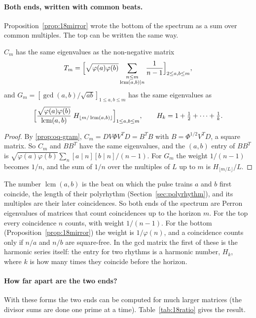 \paragraph{Both ends, written with common beats.} Proposition~\ref{prop:18mirror} wrote the bottom of the
spectrum as a sum over common multiples. The top can be written the same way.

\begin{proposition}\label{prop:18harmonic}
$C_m$ has the same eigenvalues as the non-negative matrix
\[
  T_m=\Bigl[\sqrt{\varphi(a)\varphi(b)}\sum_{\substack{n\le m\\ \operatorname{lcm}(a,b)\mid n}}\frac{1}{n-1}\Bigr]_{2\le a,b\le m},
\]
and $G_m=[\gcd(a,b)/\sqrt{ab}]_{1\le a,b\le m}$ has the same eigenvalues as
\[
  \Bigl[\frac{\sqrt{\varphi(a)\varphi(b)}}{\operatorname{lcm}(a,b)}\;H_{\lfloor m/\operatorname{lcm}(a,b)\rfloor}\Bigr]_{1\le a,b\le m},
  \qquad H_k=1+\tfrac12+\cdots+\tfrac1k .
\]
\end{proposition}

\begin{proof}
By \cref{prop:oq-gram}, $C_m=DV\Phi V^{T}D=B^{T}B$ with $B=\Phi^{1/2}V^{T}D$, a square matrix. So $C_m$ and
$BB^{T}$ have the same eigenvalues, and the $(a,b)$ entry of $BB^{T}$ is
$\sqrt{\varphi(a)\varphi(b)}\sum_{n}[a\mid n][b\mid n]/(n-1)$. For $G_m$ the weight $1/(n-1)$ becomes $1/n$,
and the sum of $1/n$ over the multiples of $L$ up to $m$ is $H_{\lfloor m/L\rfloor}/L$.
\end{proof}

The number $\operatorname{lcm}(a,b)$ is the beat on which the pulse trains $a$ and $b$ first coincide, the
length of their polyrhythm (Section~\ref{sec:polyrhythm}), and its multiples are their later coincidences. So both ends of
the spectrum are Perron eigenvalues of matrices that count coincidences up to the horizon $m$. For the top
every coincidence $n$ counts, with weight $1/(n-1)$. For the bottom
(Proposition~\ref{prop:18mirror}) the weight is $1/\varphi(n)$, and a coincidence counts only if $n/a$ and
$n/b$ are square-free. In the gcd matrix the first of these is the harmonic series itself: the entry for
two rhythms is a harmonic number, $H_k$, where $k$ is how many times they coincide before the horizon.

\paragraph{How far apart are the two ends?} With these forms the two ends can be computed for much larger
matrices (the divisor sums are done one prime at a time). Table~\ref{tab:18ratio} gives the result.

